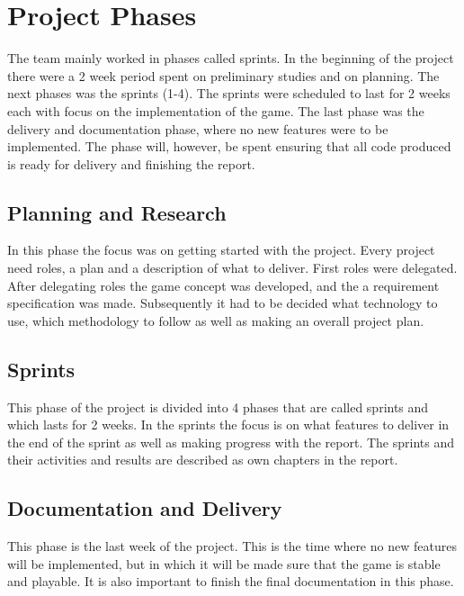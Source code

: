 \clearpage
\section{Project Phases}

The team mainly worked in phases called sprints. In the beginning of the project there were a 2 week period spent on preliminary studies and on planning. The next phases was the sprints (1-4). The sprints were scheduled to last for 2 weeks each with focus on the implementation of the game. The last phase was the delivery and documentation phase, where no new features were to be implemented. The phase will, however, be spent ensuring that all code produced is ready for delivery and finishing the report.

\subsection{Planning and Research}
In this phase the focus was on getting started with the project. Every project need roles, a plan and a description of what to deliver. First roles were delegated. After delegating roles the game concept was developed, and the a requirement specification was made. Subsequently it had to be decided what technology to use, which methodology to follow as well as making an overall project plan. 

\subsection{Sprints}
This phase of the project is divided into 4 phases that are called sprints and which lasts for 2 weeks. In the sprints the focus is on what features to deliver in the end of the sprint as well as making progress with the report. The sprints and their activities and results are described as own chapters in the report.

\subsection{Documentation and Delivery}
This phase is the last week of the project. This is the time where no new features will be implemented, but in which it will be made sure that the game is stable and playable. It is also important to finish the final documentation in this phase.
